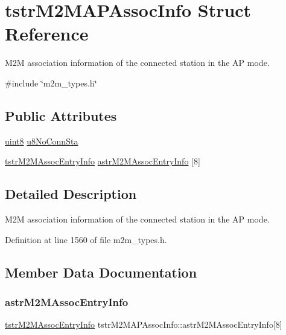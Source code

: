 \hypertarget{structtstrM2MAPAssocInfo}{}\section{tstr\+M2\+M\+A\+P\+Assoc\+Info Struct Reference}
\label{structtstrM2MAPAssocInfo}


M2M association information of the connected station in the AP mode.  




{\ttfamily \#include \char`\"{}m2m\+\_\+types.\+h\char`\"{}}

\subsection*{Public Attributes}
\begin{DoxyCompactItemize}
\item 
\hyperlink{group__DataT_ga4df709a77647e870bbf1d955b8edc9a6}{uint8} \hyperlink{structtstrM2MAPAssocInfo_a0529468d2d892e2549ba363186ec5c18}{u8\+No\+Conn\+Sta}
\item 
\hyperlink{structtstrM2MAssocEntryInfo}{tstr\+M2\+M\+Assoc\+Entry\+Info} \hyperlink{structtstrM2MAPAssocInfo_a42770504c3c5d3858f41de1431e251d1}{astr\+M2\+M\+Assoc\+Entry\+Info} \mbox{[}8\mbox{]}
\end{DoxyCompactItemize}


\subsection{Detailed Description}
M2M association information of the connected station in the AP mode. 

Definition at line 1560 of file m2m\+\_\+types.\+h.



\subsection{Member Data Documentation}
\mbox{\label{structtstrM2MAPAssocInfo_a42770504c3c5d3858f41de1431e251d1}} 
\subsubsection{\texorpdfstring{astr\+M2\+M\+Assoc\+Entry\+Info}{astrM2MAssocEntryInfo}}
{\footnotesize\ttfamily \hyperlink{structtstrM2MAssocEntryInfo}{tstr\+M2\+M\+Assoc\+Entry\+Info} tstr\+M2\+M\+A\+P\+Assoc\+Info\+::astr\+M2\+M\+Assoc\+Entry\+Info\mbox{[}8\mbox{]}}

